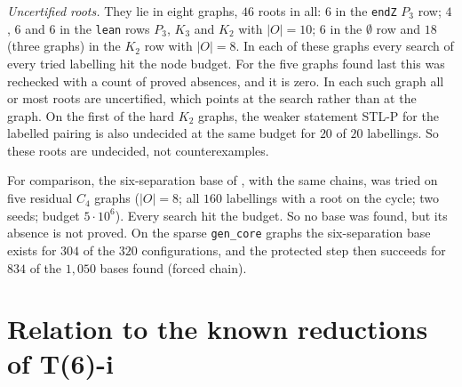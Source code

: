\documentclass[11pt]{amsart}
\theoremstyle{definition}
\begin{document}
\emph{Uncertified roots.} They lie in eight graphs, $46$ roots in all: $6$ in the
\texttt{endZ} $P_3$ row; $4$, $6$ and $6$ in the \texttt{lean} rows $P_3$, $K_3$ and $K_2$ with
$|O|=10$; $6$ in the $\emptyset$ row and $18$ (three graphs) in the $K_2$ row with $|O|=8$. In
each of these graphs every search of every tried labelling hit the node budget. For the five
graphs found last this was rechecked with a count of proved absences, and it is zero. In each
such graph all or most roots are uncertified, which points at the search rather than at the
graph. On the first of the hard $K_2$ graphs, the weaker statement STL-P for the labelled pairing
is also undecided at the same budget for $20$ of $20$ labellings. So these roots are undecided,
not counterexamples.

For comparison, the six-separation base of \cite[Thm~8.2]{TM}, with the same chains, was tried on
five residual $C_4$ graphs ($|O|=8$; all $160$ labellings with a root on the cycle; two seeds;
budget $5\cdot10^6$). Every search hit the budget. So no base was found, but its absence is not
proved. On the sparse \texttt{gen\_core} graphs the six-separation base exists for $304$ of the
$320$ configurations, and the protected step then succeeds for $834$ of the $1{,}050$ bases found
(forced chain).

\section{Relation to the known reductions of T(6)-i}\label{sec:novelty}
\end{document}

